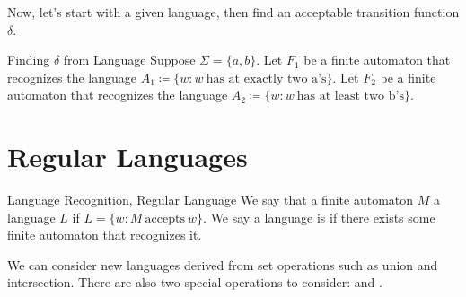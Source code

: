 Now, let's start with a given language, then find an acceptable transition function $\delta$.
\begin{exbox}{Finding $\delta$ from Language}{}
    Suppose $\Sigma = \{a, b\}$. Let $F_1$ be a finite automaton that recognizes the language $A_1 \coloneq \{w : w\ \text{has at exactly two a's} \}$. Let $F_2$ be a finite automaton that recognizes the language $A_2 \coloneq \{w : w\ \text{has at least two b's} \}$.


\end{exbox}

\section{Regular Languages}

\begin{dfnbox}{Language Recognition, Regular Language}{}
    We say that a finite automaton $M$  a language $L$ if $L = \{ w : M\ \text{accepts}\ w \}$. We say a language is  if there exists some finite automaton that recognizes it.

\end{dfnbox}

We can consider new languages derived from set operations such as union and intersection. There are also two special operations to consider:  and .

